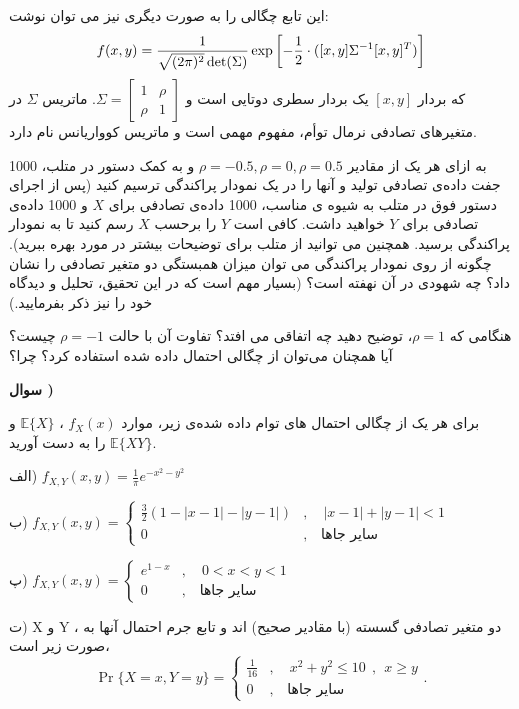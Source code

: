 \documentclass[10pt,letterpaper]{report}
\newcounter{questionnumber}
\newcommand{\Q}{
\textbf{سوال \thequestionnumber)}
\stepcounter{questionnumber}
}
\begin{document}
این تابع چگالی را به صورت دیگری نیز می توان نوشت:
$$
f(x,y)={1\over \sqrt{(2\pi)^2}\det(\Sigma)}\exp\left[-{1\over 2}\cdot([x,y]\Sigma^{-1}[x,y]^T)\right]
$$
که بردار $[x,y]$ یک بردار سطری دوتایی است و 
$
\Sigma=\begin{bmatrix}
1&\rho\\
\rho&1
\end{bmatrix}
$.
ماتریس $\Sigma$ در متغیرهای تصادفی نرمال توأم، مفهوم مهمی است و ماتریس کوواریانس نام دارد.

به ازای هر یک از مقادیر 
$\rho=-0.5,\rho=0,\rho=0.5$
 و به کمک دستور 
 در متلب، 1000 جفت داده‌ی تصادفی تولید و آنها را در یک نمودار پراکندگی ترسیم کنید (پس از اجرای دستور فوق در متلب به شیوه ی مناسب، 1000 داده‌ی تصادفی برای $X$ و 1000 داده‌ی تصادفی برای $Y$ خواهید داشت. کافی است $Y$ را برحسب $X$ رسم کنید تا به نمودار پراکندگی برسید. همچنین می توانید از  متلب برای توضیحات بیشتر در مورد  بهره ببرید). چگونه از روی نمودار پراکندگی می توان میزان همبستگی دو متغیر تصادفی را نشان داد؟ چه شهودی در آن نهفته است؟ (بسیار مهم است که در این تحقیق، تحلیل و دیدگاه خود را نیز ذکر بفرمایید.)

هنگامی که $\rho=1$، توضیح دهید چه اتفاقی می افتد؟ تفاوت آن با حالت $\rho=-1$ چیست؟ آیا همچنان می‌توان از چگالی احتمال داده شده استفاده کرد؟ چرا؟


\Q
برای هر یک از چگالی احتمال های توام داده شده‌ی زیر، موارد 
$
f_X(x)
$
،
$
\mathbb{E}\{X\}
$
و
$
\mathbb{E}\{XY\}
$
را به دست آورید.

الف) 
$
f_{X,Y}(x,y)=\frac{1}{\pi}e^{-x^2-y^2}
$

ب) 
$
f_{X,Y}(x,y)=\begin{cases}
\frac{3}{2}(1-|x-1|-|y-1|)&,\quad |x-1|+|y-1|<1\\
0&,\quad \text{سایر جاها}
\end{cases}
$

پ)
$
f_{X,Y}(x,y)=\begin{cases}
e^{1-x}&,\quad 0<x<y<1\\
0&,\quad \text{سایر جاها}
\end{cases}
$

ت) X و Y ، دو متغیر تصادفی گسسته (با مقادیر صحیح) اند و تابع جرم احتمال آنها به صورت زیر است،
$$
\Pr\{X=x,Y=y\}=\begin{cases}
\frac{1}{16}&,\quad x^2+y^2\le 10 \ \ ,\ \ x\ge y\\
0&,\quad \text{سایر جاها}
\end{cases}
.
$$
\end{document}

